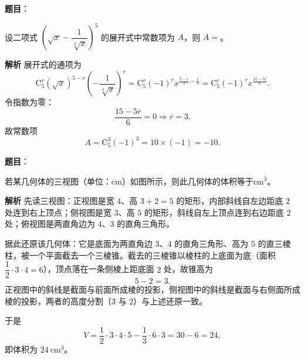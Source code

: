 \begin{answer}

\textbf{题目}：

设二项式 $\left(\sqrt x-\dfrac1{\sqrt[3]x}\right)^5$ 的展开式中常数项为 $A$，则 $A=$\gkblank{}。

\textbf{解析}
展开式的通项为
\nopagebreak[4]
\[\mathrm C_5^r\left(\sqrt x\right)^{5-r}\left(-\frac1{\sqrt[3]x}\right)^r
=\mathrm C_5^r(-1)^rx^{\frac{5-r}2-\frac r3}
=\mathrm C_5^r(-1)^rx^{\frac{15-5r}6}.\]
令指数为零：
\nopagebreak[4]
\[\frac{15-5r}6=0\Longrightarrow r=3.\]
故常数项
\nopagebreak[4]
\[A=\mathrm C_5^3(-1)^3=10\times(-1)=-10.\]


\end{answer}
\begin{answer}

\textbf{题目}：

若某几何体的三视图（单位：cm）如图所示，则此几何体的体积等于\gkblank{}$\mathrm{cm}^3$。
\nopagebreak[4]
\begin{center}\end{center}
\nopagebreak[4]
\textbf{解析}
先读三视图：正视图是宽 $4$、高 $3+2=5$ 的矩形，内部斜线自左边距底 $2$ 处连到右上顶点；侧视图是宽 $3$、高 $5$ 的矩形，斜线自左上顶点连到右边距底 $2$ 处；俯视图是两直角边为 $4$、$3$ 的直角三角形。

据此还原该几何体：它是底面为两直角边 $3$、$4$ 的直角三角形、高为 $5$ 的直三棱柱，被一个平面截去一个三棱锥。截去的三棱锥以棱柱的上底面为底（面积 $\dfrac12\cdot3\cdot4=6$），顶点落在一条侧棱上距底面 $2$ 处，故锥高为
\nopagebreak[4]
\[5-2=3.\]
正视图中的斜线是截面与前面所成棱的投影，侧视图中的斜线是截面与右侧面所成棱的投影，两者的高度分割（$3$ 与 $2$）与上述还原一致。

于是
\nopagebreak[4]
\[V=\frac12\cdot3\cdot4\cdot5-\frac13\cdot6\cdot3=30-6=24,\]
即体积为 $24\ \mathrm{cm}^3$。


\end{answer}
